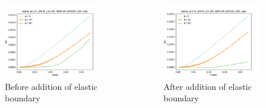 \begin{frame}
\begin{columns}
\begin{column}{0.45\columnwidth}
\begin{figure}[tbp]
\centering
\includegraphics[width=\columnwidth]{before-J_CMOD_bend_ac10_at08_L1100_W0500_E0100_n20_wrp}
\caption{Before addition of elastic boundary}
\end{figure}
\end{column}
\begin{column}{0.45\columnwidth}
\begin{figure}
\centering
\includegraphics[width=\columnwidth]{after-J_CMOD_bend_ac10_at08_L1100_W0500_E0100_n20_wrp}
\caption{After addition of elastic boundary}
\end{figure}
\end{column}
\end{columns}
\end{frame}

